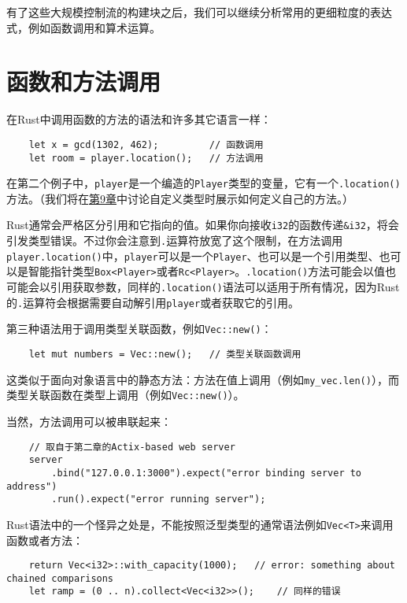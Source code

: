 有了这些大规模控制流的构建块之后，我们可以继续分析常用的更细粒度的表达式，例如函数调用和算术运算。

\section{函数和方法调用}

在Rust中调用函数的方法的语法和许多其它语言一样：
\begin{verbatim}
    let x = gcd(1302, 462);         // 函数调用
    let room = player.location();   // 方法调用
\end{verbatim}

在第二个例子中，\texttt{player}是一个编造的\texttt{Player}类型的变量，它有一个\texttt{.location()}方法。（我们将在\hyperref[ch09]{第9章}中讨论自定义类型时展示如何定义自己的方法。）

Rust通常会严格区分引用和它指向的值。如果你向接收\texttt{i32}的函数传递\texttt{\&i32}，将会引发类型错误。不过你会注意到\texttt{.}运算符放宽了这个限制，在方法调用\texttt{player.location()}中，\texttt{player}可以是一个\texttt{Player}、也可以是一个引用类型、也可以是智能指针类型\texttt{Box<Player>}或者\texttt{Rc<Player>}。\texttt{.location()}方法可能会以值也可能会以引用获取参数，同样的\texttt{.location()}语法可以适用于所有情况，因为Rust的\texttt{.}运算符会根据需要自动解引用\texttt{player}或者获取它的引用。

第三种语法用于调用类型关联函数，例如\texttt{Vec::new()}：
\begin{verbatim}
    let mut numbers = Vec::new();   // 类型关联函数调用
\end{verbatim}

这类似于面向对象语言中的静态方法：方法在值上调用（例如\texttt{my\_vec.len()}），而类型关联函数在类型上调用（例如\texttt{Vec::new()}）。

当然，方法调用可以被串联起来：
\begin{verbatim}
    // 取自于第二章的Actix-based web server
    server
        .bind("127.0.0.1:3000").expect("error binding server to address")
        .run().expect("error running server");
\end{verbatim}

Rust语法中的一个怪异之处是，不能按照泛型类型的通常语法例如\texttt{Vec<T>}来调用函数或者方法：
\begin{verbatim}
    return Vec<i32>::with_capacity(1000);   // error: something about chained comparisons
    let ramp = (0 .. n).collect<Vec<i32>>();    // 同样的错误
\end{verbatim}

